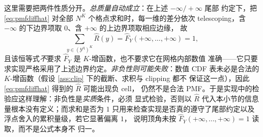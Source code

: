 \documentclass[a4paper,11pt]{article}
\theoremstyle{definition}
\newcommand{\1}{\mathbf 1}
\begin{document}
这里需要把两件性质分开。\emph{总质量自动成立}：在上述 $-\infty/+\infty$ 尾部
约定下，把 \eqref{eq:pmfdiffhat} 对全部 $N^{K}$ 个格点求和时，每一维的差分依次
telescoping，含 $-\infty$ 的下边界项取 $0$、含 $+\infty$ 的上边界项取相应边缘，
故
\[
\sum_{y\in(\mathcal Y^{\mathrm q})^{K}}\widehat R(y)
=\widehat F_Y(+\infty,\ldots,+\infty)=1 ,
\]
且该恒等式\emph{不}要求 $\widehat F_Y$ 是 $K$-增函数，也不要求它在网格内部数值
准确——它只要求实现严格采用了上述边界约定。\emph{非负性则可能失败}：数值 CDF
表未必是合法的 $K$-增函数（假设 \ref{ass:clip} 下的截断、求积与 clipping 都不
保证这一点），因此 \eqref{eq:pmfdiffhat} 得到的 $\widehat R$ 可能出现负 cell，
仍然不是合法 PMF。于是实现中的检验应这样理解：非负性是\emph{实质}条件，必须
显式检验，否则以 $\widehat R$ 代入本小节的信息量根本没有定义；而求和是否为 $1$
只用来检查实现是否真的遵守了尾部约定以及浮点舍入的累积量级，若它显著偏离 $1$，
说明顶角未按 $\widehat F_Y(+\infty,\ldots,+\infty)=1$ 读取，而不是公式本身不
归一。
\end{document}
